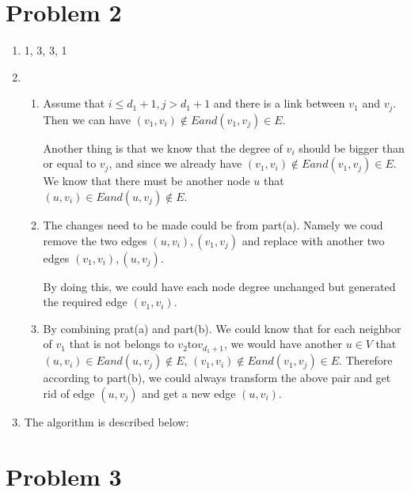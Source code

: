 \documentclass{article} %
\begin{document}
\newpage
\section*{Problem 2}
\begin{enumerate}
\item 1, 3, 3, 1
\item 
  \begin{enumerate}
  \item 
    Assume that $i \leq d_1 + 1, j > d_1 + 1$ and there is a link between $v_1$
    and $v_j$. Then we can have $(v_1, v_i) \notin E and (v_1, v_j) \in E$.

    Another thing is that we know that the degree of $v_i$ should be bigger than
    or equal to $v_j$, and since we already have $(v_1, v_i) \notin E and (v_1,
    v_j) \in E$. We know that there must be another node $u$ that $(u, v_i) \in
    E and (u, v_j) \notin E$.

  \item 
    The changes need to be made could be from part(a). Namely we coud remove the
    two edges $(u, v_i), (v_1, v_j)$ and replace with another two edges $(v_1,
    v_i), (u, v_j)$.
    
    By doing this, we could have each node degree unchanged but generated the
    required edge $(v_1, v_i)$.

  \item 
    By combining prat(a) and part(b). We could know that for each neighbor of
    $v_1$ that is not belongs to $v_2 \text{to} v_{d_1+1}$, we would have
    another $u \in V$ that $(u, v_i) \in E and (u, v_j) \notin E$, $(v_1, v_i)
    \notin E and (v_1, v_j) \in E$. Therefore according to part(b), we could
    always transform the above pair and get rid of edge $(u, v_j)$ and get a new
    edge $(u, v_i)$.

  \end{enumerate}

\item 
  The algorithm is described below:


\end{enumerate}
\newpage
\section*{Problem 3}

\newpage
\end{document}
